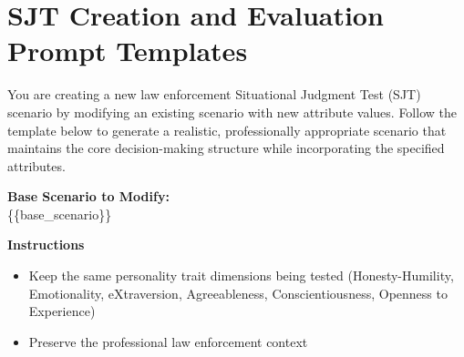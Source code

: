 \documentclass[11pt]{article}
\begin{document}



\section{SJT Creation and Evaluation Prompt Templates}
\label{app:prompt templates}
\begin{tcolorbox}[enhanced,
    colback=gray!5,
    colframe=black!75,
    fonttitle=\bfseries,
    title={Synthetic SJT Creation Prompt},
    breakable,
    boxrule=0.6pt
]
\small
You are creating a new law enforcement Situational Judgment Test (SJT) scenario by modifying an existing scenario with new attribute values. Follow the template below to generate a realistic, professionally appropriate scenario that maintains the core decision-making structure while incorporating the specified attributes.

\textbf{Base Scenario to Modify:} \\
\{\{base\_scenario\}\}

\medskip
\textbf{Instructions}
\begin{itemize}
\item Keep the same personality trait dimensions being tested (\textcolor{hexH}{Honesty-Humility}, \textcolor{hexE}{Emotionality}, \textcolor{hexX}{eXtraversion}, \textcolor{hexA}{Agreeableness}, \textcolor{hexC}{Conscientiousness}, \textcolor{hexO}{Openness to Experience})
\item Preserve the professional law enforcement context
\end{itemize}


\end{tcolorbox}
\end{document}
